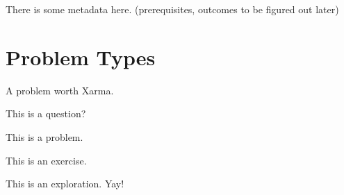 \documentclass{ximera}
\begin{document}
There is some metadata here. (prerequisites, outcomes to be figured out later)





\section{Problem Types}

\begin{xarmaBoost}
A problem worth Xarma.
\end{xarmaBoost}

\begin{question}
This is a question?
\end{question}

\begin{problem}
This is a problem.
\end{problem}

\begin{exercise}
This is an exercise.
\end{exercise}

\begin{exploration}
This is an exploration. Yay!
\end{exploration}
\end{document}
